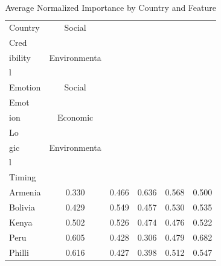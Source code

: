 \begin{table}[htbp]
\centering
\small
\caption{Average Normalized Importance by Country and Feature}
\label{tab:avg_importance}
\begin{tabular}{lccccc}
\toprule
Country & Social\\Cred \\[-0.5ex] ibility & Environmenta \\[-0.5ex] l\\Emotion & Social\\Emot \\[-0.5ex] ion & Economic\\Lo \\[-0.5ex] gic & Environmenta \\[-0.5ex] l\\Timing \\
\midrule
 Armenia & 0.330 & 0.466 & 0.636 & 0.568 & 0.500 \\
 Bolivia & 0.429 & 0.549 & 0.457 & 0.530 & 0.535 \\
 Kenya & 0.502 & 0.526 & 0.474 & 0.476 & 0.522 \\
 Peru & 0.605 & 0.428 & 0.306 & 0.479 & 0.682 \\
 Philli & 0.616 & 0.427 & 0.398 & 0.512 & 0.547 \\
\bottomrule
\end{tabular}
\end{table}
